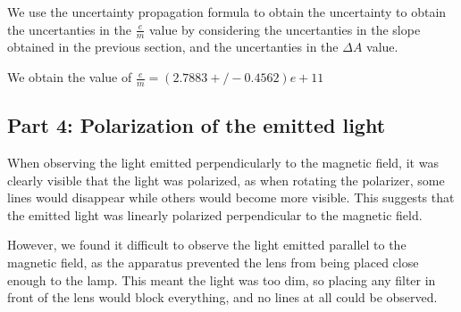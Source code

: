 We use the uncertainty propagation formula to obtain the uncertainty to obtain the uncertanties in the $\frac{e}{m}$ value
by considering the uncertanties in the slope obtained in the previous section, and the uncertanties in the $\Delta A$ value.


We obtain the value of $\frac{e}{m} = (2.7883+/-0.4562)e+11$

\subsection{Part 4: Polarization of the emitted light}
When observing the light emitted perpendicularly to the magnetic field, it was clearly visible that the light was polarized, as when rotating the polarizer, some lines would disappear while others would become more visible.
This suggests that the emitted light was linearly polarized perpendicular to the magnetic field.

However, we found it difficult to observe the light emitted parallel to the
magnetic field, as the apparatus prevented the lens from being placed close enough
to the lamp. This meant the light was too dim, so placing any filter in front of the lens would block everything, and no
lines at all could be observed.
